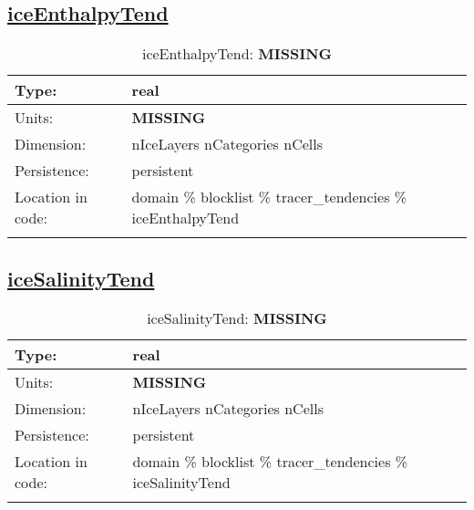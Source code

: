 \subsection[iceEnthalpyTend]{\hyperref[sec:var_tab_tracer_tendencies]{iceEnthalpyTend}}
\label{subsec:var_sec_tracer_tendencies_iceEnthalpyTend}
\begin{center}
\begin{longtable}{| p{2.0in} | p{4.0in} |}
        \hline 
        Type: & real \\
        \hline 
        Units: & {\bf \color{red} MISSING} \\
        \hline 
        Dimension: & nIceLayers nCategories nCells \\
        \hline 
        Persistence: & persistent \\
        \hline 
         Location in code: & domain \% blocklist \% tracer\_tendencies \% iceEnthalpyTend \\
         \hline 
    \caption{iceEnthalpyTend: {\bf \color{red} MISSING}}
\end{longtable}
\end{center}
\subsection[iceSalinityTend]{\hyperref[sec:var_tab_tracer_tendencies]{iceSalinityTend}}
\label{subsec:var_sec_tracer_tendencies_iceSalinityTend}
\begin{center}
\begin{longtable}{| p{2.0in} | p{4.0in} |}
        \hline 
        Type: & real \\
        \hline 
        Units: & {\bf \color{red} MISSING} \\
        \hline 
        Dimension: & nIceLayers nCategories nCells \\
        \hline 
        Persistence: & persistent \\
        \hline 
         Location in code: & domain \% blocklist \% tracer\_tendencies \% iceSalinityTend \\
         \hline 
    \caption{iceSalinityTend: {\bf \color{red} MISSING}}
\end{longtable}
\end{center}
